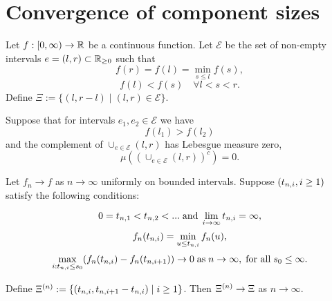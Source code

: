 
\chapter{Convergence of component sizes}



\begin{lemma} \label{L: Deterministic Lemma}
	Let $f:[0, \infty) \rightarrow \mathbb{R}$ be a continuous function. 
	Let $\mathcal{E}$ be the set of non-empty intervals 
	$e=(l,r) \subset \mathbb{R}_{\geq 0}$
	such that
	\begin{equation} \label{E: f cond 1}
	f(r) = f(l) = \min_{s \leq l} f(s),
	\end{equation}
	\begin{equation} \label{E: f cond 2}
	f(l) < f(s) \quad \forall l < s < r.
	\end{equation}
	Define $\Xi := \lbrace (l, r-l) \; | \; (l, r) \in \mathcal{E} \rbrace$.
	
	Suppose that for intervals $e_1, e_2 \in \mathcal{E}$ we have 
	\begin{equation} \label{E: f cond f(l1) > f(l2)}
	f(l_1) > f(l_2)
	\end{equation}
	and the complement of $\cup_{e \in \mathcal{E}} (l,r)$ has Lebesgue measure zero,
	\begin{equation} \label{E: f cond complement zero}
	\mu \left( \left( \cup_{e \in \mathcal{E}} (l,r) \right)^c\right) = 0.
	\end{equation}
	
	Let $f_n \rightarrow f$ as $n \rightarrow \infty$ uniformly on bounded intervals.
	Suppose $(t_{n, i}, i \geq 1)$ satisfy the following conditions:
	
	\begin{equation} \label{E: fn cond 3}
	0 = t_{n, 1} < t_{n, 2} < ... \; \text{and} \; \lim_{i \rightarrow \infty} t_{n, i} = \infty,
	\end{equation}
	\begin{equation} \label{E: fn cond 4}
	f_n(t_{n, i}) = \min_{u \leq t_{n, i}}f_n(u), 
	\end{equation}
	\begin{equation} \label{E: fn cond 5}
	\max_{i: t_{n, i} \leq s_0}(f_n(t_{n, i}) - f_n(t_{n, i+1})) \rightarrow 0 \; \text{as} \; n \rightarrow \infty, \; \text{for all} \; s_0 \leq \infty.
	\end{equation}
	
	Define $\Xi^{(n)} := \lbrace (t_{n, i}, t_{n, i+1} - t_{n, i}) \; | \; i \geq 1 \rbrace$.
	Then $\Xi^{(n)} \rightarrow \Xi$ as $n \rightarrow \infty$.
\end{lemma}

